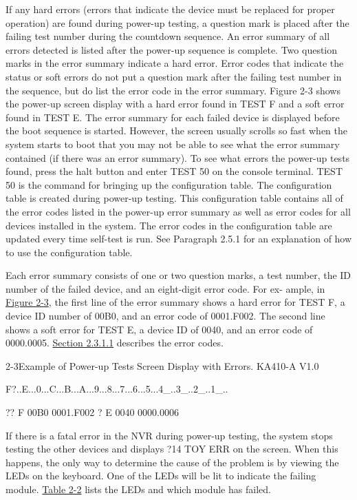 If any hard errors (errors that indicate the device must be replaced for
proper operation) are found during power-up testing, a question mark is
placed after the failing test number during the countdown sequence. An
error summary of all errors detected is listed after the power-up sequence
is complete. Two question marks in the error summary indicate a hard error.
Error codes that indicate the status or soft errors do not put a question mark
after the failing test number in the sequence, but do list the error code in the
error summary. Figure 2-3 shows the power-up screen display with a hard
error found in TEST F and a soft error found in TEST E. The error summary
for each failed device is displayed before the boot sequence is started.
However, the screen usually scrolls so fast when the system starts to boot
that you may not be able to see what the error summary contained (if there
was an error summary). To see what errors the power-up tests found, press
the halt button and enter TEST 50 on the console terminal. TEST 50 is the
command for bringing up the configuration table. The configuration table
is created during power-up testing. This configuration table contains all of
the error codes listed in the power-up error summary as well as error codes
for all devices installed in the system. The error codes in the configuration
table are updated every time self-test is run. See Paragraph 2.5.1 for an
explanation of how to use the configuration table.

Each error summary consists of one or two question marks, a test number,
the ID number of the failed device, and an eight-digit error code. For ex-
ample, in \hyperref[figure:2-3]{Figure 2-3}, the first line of the error summary shows a hard error
for TEST F, a device ID number of 00B0, and an error code of 0001.F002.
The second line shows a soft error for TEST E, a device ID of 0040, and an
error code of 0000.0005. \hyperlink{subsubsection.2.3.1.1}{Section 2.3.1.1} describes the error codes.
\newpage
\begin{ttfig}{2-3}{Example of Power-up Tests Screen Display with Errors.}
KA410-A V1.0

F?..E...0...C...B...A...9...8...7...6...5...4_..3_..2_..1_..

?? F  00B0  0001.F002
 ? E  0040  0000.0006
\end{ttfig}

If there is a fatal error in the NVR during power-up testing, the system stops
testing the other devices and displays ?14 TOY ERR on the screen. When
this happens, the only way to determine the cause of the problem is by
viewing the LEDs on the keyboard. One of the LEDs will be lit to indicate
the failing module. \hyperref[table:2-2]{Table 2-2} lists the LEDs and which module has failed.

